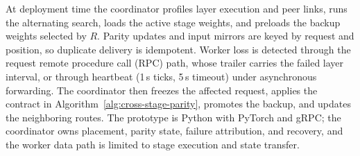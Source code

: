 At deployment time the coordinator profiles layer execution and peer links,
runs the alternating search, loads the active stage weights, and preloads the
backup weights selected by $R$.  Parity updates and input mirrors are keyed by
request and position, so duplicate delivery is idempotent.  Worker loss is
detected through the request remote procedure call (RPC) path, whose trailer
carries the failed layer interval, or through heartbeat (1\,s ticks, 5\,s timeout) under asynchronous forwarding.  The coordinator then freezes the affected request, applies the
contract in Algorithm~\ref{alg:cross-stage-parity}, promotes the backup, and
updates the neighboring routes.  The prototype is Python with PyTorch and gRPC; the coordinator owns
placement, parity state, failure attribution, and recovery, and the worker
data path is limited to stage execution and state transfer.
